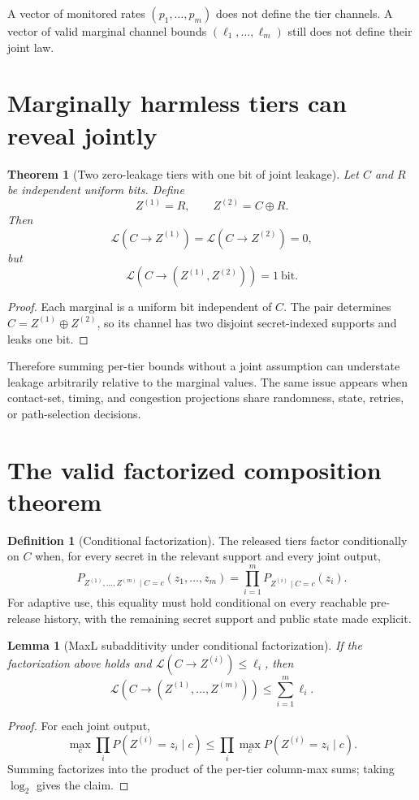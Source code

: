\documentclass[11pt]{article}
\newtheorem{theorem}{Theorem}
\newtheorem{lemma}{Lemma}
\theoremstyle{definition}
\newtheorem{definition}{Definition}
\newcommand{\MaxL}{\mathcal{L}}
\begin{document}
A vector of monitored rates \((p_1,\ldots,p_m)\) does not define the tier channels. A vector of valid marginal channel bounds \((\ell_1,\ldots,\ell_m)\) still does not define their joint law.

\section{Marginally harmless tiers can reveal jointly}\label{sec:synergy}
\begin{theorem}[Two zero-leakage tiers with one bit of joint leakage]\label{thm:synergy}
Let \(C\) and \(R\) be independent uniform bits. Define
\[
Z^{(1)}=R,
\qquad
Z^{(2)}=C\oplus R.
\]
Then
\[
\MaxL(C\to Z^{(1)})=\MaxL(C\to Z^{(2)})=0,
\]
but
\[
\MaxL(C\to (Z^{(1)},Z^{(2)}))=1\ \text{bit}.
\]
\end{theorem}
\begin{proof}
Each marginal is a uniform bit independent of \(C\). The pair determines \(C=Z^{(1)}\oplus Z^{(2)}\), so its channel has two disjoint secret-indexed supports and leaks one bit.
\end{proof}

Therefore summing per-tier bounds without a joint assumption can understate leakage arbitrarily relative to the marginal values. The same issue appears when contact-set, timing, and congestion projections share randomness, state, retries, or path-selection decisions.

\section{The valid factorized composition theorem}\label{sec:composition}
\begin{definition}[Conditional factorization]
The released tiers factor conditionally on \(C\) when, for every secret in the relevant support and every joint output,
\[
P_{Z^{(1)},\ldots,Z^{(m)}\mid C=c}(z_1,\ldots,z_m)
=\prod_{i=1}^m P_{Z^{(i)}\mid C=c}(z_i).
\]
For adaptive use, this equality must hold conditional on every reachable pre-release history, with the remaining secret support and public state made explicit.
\end{definition}

\begin{lemma}[MaxL subadditivity under conditional factorization]\label{lem:maxl-add}
If the factorization above holds and \(\MaxL(C\to Z^{(i)})\le\ell_i\), then
\[
\MaxL(C\to (Z^{(1)},\ldots,Z^{(m)}))\le\sum_{i=1}^m\ell_i.
\]
\end{lemma}
\begin{proof}
For each joint output,
\[
\max_c\prod_iP(Z^{(i)}=z_i\mid c)
\le\prod_i\max_cP(Z^{(i)}=z_i\mid c).
\]
Summing factorizes into the product of the per-tier column-max sums; taking \(\log_2\) gives the claim.
\end{proof}
\end{document}

